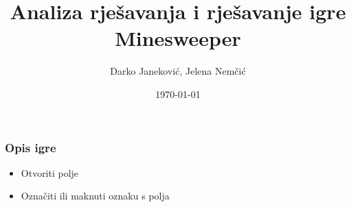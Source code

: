 \documentclass{beamer}
\title{Analiza rješavanja i rješavanje igre Minesweeper}
\date{\today}
\author{Darko Janeković, Jelena Nemčić}
\institute{Fakultet elektrotehnike i računarstva}
\begin{document}
    \maketitle

    \begin{frame}[t]
        \frametitle{Opis igre}
        \begin{itemize}
            \item<1-> Otvoriti polje
            \item<2-> Označiti ili maknuti oznaku s polja
        \end{itemize}
        \begin{figure}
            \centering
        \end{figure}
    \end{frame}
\end{document}
